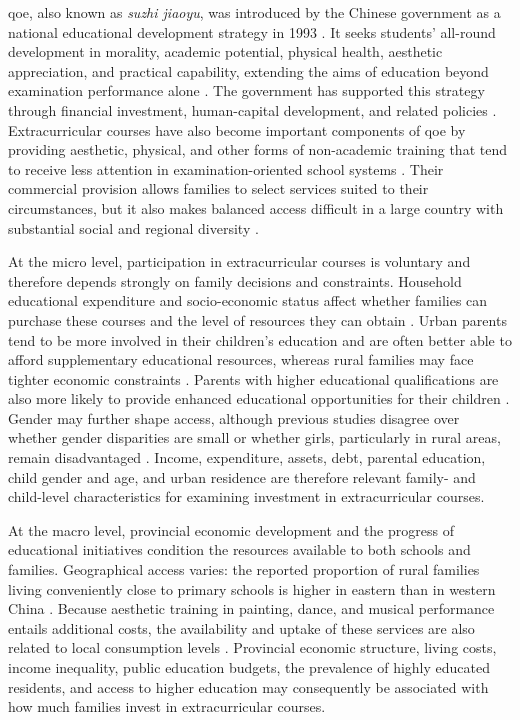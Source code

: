 \documentclass[times]{interact}
\theoremstyle{plain}%
\theoremstyle{definition}
\theoremstyle{remark}
\begin{document}
\Gls{qoe}, also known as \textit{suzhi jiaoyu}, was introduced by the Chinese government as a national educational development strategy in 1993 \citep{CCCPC-1993}.
It seeks students' all-round development in morality, academic potential, physical health, aesthetic appreciation, and practical capability, extending the aims of education beyond examination performance alone \citep{LiuLi-2020-en,Dello-Iacovo-2009,Deng-1994b,Wang-2018}.
The government has supported this strategy through financial investment, human-capital development, and related policies \citep{Xie-2017-en,Vilairat-2019,DPCSEC-1997-en,LiuLi-2020-en,SiQiao-2017,HanYe-2017}.
Extracurricular courses have also become important components of \gls{qoe} by providing aesthetic, physical, and other forms of non-academic training that tend to receive less attention in examination-oriented school systems \citep{ZhangTang-2017,ZhengYuan-2021}.
Their commercial provision allows families to select services suited to their circumstances, but it also makes balanced access difficult in a large country with substantial social and regional diversity \citep{HeHuang-2021,WuKC-2022}.

At the micro level, participation in extracurricular courses is voluntary and therefore depends strongly on family decisions and constraints.
Household educational expenditure and socio-economic status affect whether families can purchase these courses and the level of resources they can obtain \citep{ChiQian-2016,QianChi-2015-en,SongZhou-2019,TanCai-2022,RenChen-2021}.
Urban parents tend to be more involved in their children's education and are often better able to afford supplementary educational resources, whereas rural families may face tighter economic constraints \citep{NieTeng-2021,YangChen-2023}.
Parents with higher educational qualifications are also more likely to provide enhanced educational opportunities for their children \citep{Wang-2021a}.
Gender may further shape access, although previous studies disagree over whether gender disparities are small or whether girls, particularly in rural areas, remain disadvantaged \citep{LuoZeng-2022,ZhangLiang-2022,DongLi-2008,Xiao-2015}.
Income, expenditure, assets, debt, parental education, child gender and age, and urban residence are therefore relevant family- and child-level characteristics for examining investment in extracurricular courses.

At the macro level, provincial economic development and the progress of educational initiatives condition the resources available to both schools and families.
Geographical access varies: the reported proportion of rural families living conveniently close to primary schools is higher in eastern than in western China \citep{ZhangWang-2019}.
Because aesthetic training in painting, dance, and musical performance entails additional costs, the availability and uptake of these services are also related to local consumption levels \citep{YouDing-2021,Cheng-2021,Zhou-2013}.
Provincial economic structure, living costs, income inequality, public education budgets, the prevalence of highly educated residents, and access to higher education may consequently be associated with how much families invest in extracurricular courses.
\end{document}
